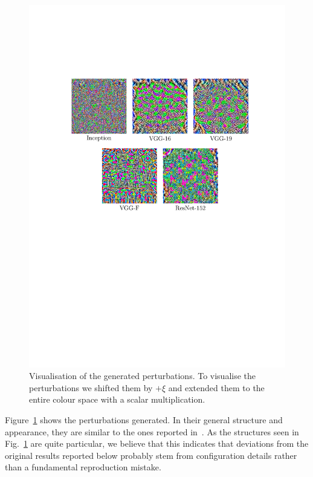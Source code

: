 \documentclass[runningheads]{llncs}
\begin{document}
\begin{figure}[ht]
	\centering
	\includegraphics[clip, trim=3.8cm 12.9cm 2.8cm 5.8cm, width=1.0\textwidth]{plots_generierung/perturbationsFigure.pdf}
	\caption{Visualisation of the generated perturbations. To visualise the perturbations we shifted them by $+\xi$ and extended them to the entire colour space with a scalar multiplication.}\label{fig_stoerwerte}
\end{figure}

Figure~\ref{fig_stoerwerte} shows the perturbations generated. In their general structure and appearance, they are similar to the ones reported in~\cite{moosavidezfooli_universal_2017}. As the structures seen in Fig.~\ref{fig_stoerwerte} are quite particular, we believe that this indicates that deviations from the original results reported below probably stem from configuration details rather than a fundamental reproduction mistake.
\end{document}
